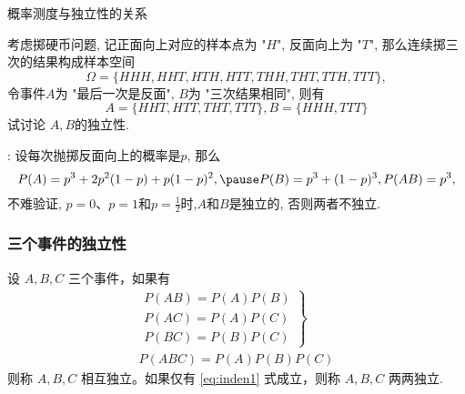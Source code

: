 \begin{frame}{概率测度与独立性的关系}
  \begin{exam}
    考虑掷硬币问题, 记正面向上对应的样本点为 "$H$", 反面向上为 "$T$", 那么连续掷三次的结果构成样本空间
  \[
  \Omega=\{H H H, H H T, H T H, H T T, T H H, T H T, T T H, T T T\},
  \]
    令事件$A$为 "最后一次是反面", $B$为 "三次结果相同", 则有
  \[
  A=\{H H T, H T T, T H T, T T T\},  B=\{H H H, T T T\}
  \]试讨论 $A, B$的独立性.
  \end{exam}
\pause

\jieda: 设每次抛掷反面向上的概率是$p$, 那么\pause
\[
P(A)=p^{3}+2 p^{2}(1-p)+p(1-p)^{2}, \pause  P(B)=p^{3}+(1-p)^{3},  P(A B)=p^{3},
\]
\pause
不难验证, $p=0$、$p=1$和$p=\frac{1}{2}$时,$A$和$B$是独立的, 否则两者不独立.


\end{frame}







   \begin{frame}
	\frametitle{三个事件的独立性}
	\begin{defi}
		设 $A,B,C$ 三个事件，如果有
		\begin{eqnarray}\label{eq:inden1}
			\left.\begin{array}{l}
				P(AB)=P(A)P(B)\\
				P(AC)=P(A)P(C) \\
				P(BC)=P(B)P(C)
			\end{array}\right\}\\
			\label{eq:inden2}
			P(ABC)=P(A)P(B)P(C)
		\end{eqnarray}
		则称 $A,B,C$ 相互独立。如果仅有 \eqref{eq:inden1} 式成立，则称 $A,B,C$ 两两独立.
	\end{defi}
\end{frame}

